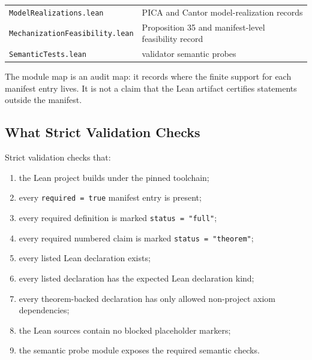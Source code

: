 \documentclass[11pt]{article}
\providecommand{\tightlist}{}
\theoremstyle{definition}
\begin{document}
\begin{longtable}[]{@{}ll@{}}
\begin{minipage}[t]{0.47\columnwidth}
\texttt{ModelRealizations.lean}\strut
\end{minipage} & \begin{minipage}[t]{0.47\columnwidth}\raggedright
PICA and Cantor model-realization records\strut
\end{minipage}\tabularnewline
\begin{minipage}[t]{0.47\columnwidth}\raggedright
\texttt{MechanizationFeasibility.lean}\strut
\end{minipage} & \begin{minipage}[t]{0.47\columnwidth}\raggedright
Proposition 35 and manifest-level feasibility record\strut
\end{minipage}\tabularnewline
\begin{minipage}[t]{0.47\columnwidth}\raggedright
\texttt{SemanticTests.lean}\strut
\end{minipage} & \begin{minipage}[t]{0.47\columnwidth}\raggedright
validator semantic probes\strut
\end{minipage}\tabularnewline
\bottomrule
\end{longtable}

The module map is an audit map: it records where the finite support for each manifest entry lives. It is not a claim that the Lean artifact certifies statements outside the manifest.

\subsection{What Strict Validation Checks}

Strict validation checks that:

\begin{enumerate}
\def\labelenumi{\arabic{enumi}.}
\tightlist
\item
  the Lean project builds under the pinned toolchain;
\item
  every \texttt{required\ =\ true} manifest entry is present;
\item
  every required definition is marked \texttt{status\ =\ "full"};
\item
  every required numbered claim is marked \texttt{status\ =\ "theorem"};
\item
  every listed Lean declaration exists;
\item
  every listed declaration has the expected Lean declaration kind;
\item
  every theorem-backed declaration has only allowed non-project axiom dependencies;
\item
  the Lean sources contain no blocked placeholder markers;
\item
  the semantic probe module exposes the required semantic checks.
\end{enumerate}
\end{document}
